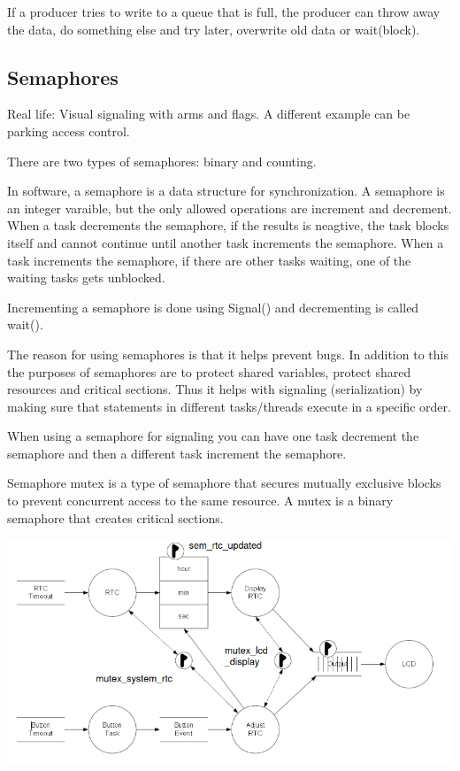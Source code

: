 If a producer tries to write to a queue that is full, the producer
can throw away the data, do something else and try later,
overwrite old data or wait(block).



\subsection{Semaphores}

Real life: Visual signaling with arms and flags. A different example
can be parking access control.

There are two types of semaphores: binary and counting.

In software, a semaphore is a data structure for synchronization.
A semaphore is an integer varaible, but the only allowed operations
are increment and decrement. When a task decrements the
semaphore, if the results is neagtive,
the task blocks itself and cannot continue until
another task increments the semaphore.
When a task increments the semaphore, if there are other tasks waiting,
one of the waiting tasks gets unblocked.

Incrementing a semaphore is done using Signal() and decrementing
is called wait().

The reason for using semaphores is that it helps prevent bugs.
In addition to this the purposes of semaphores are to protect shared
variables, protect shared resources and critical sections.
Thus it helps with signaling (serialization)
by making sure that statements in different tasks/threads execute
in a specific order.

When using a semaphore for signaling you can have one task decrement the semaphore
and then a different task increment the semaphore.

Semaphore mutex is a type of semaphore that secures mutually exclusive
blocks to prevent concurrent access to the same resource.
A mutex is a binary semaphore that creates critical sections.

\begin{center}
	\includegraphics[width=\textwidth]{images/taskSemaphore.png}
\end{center}



